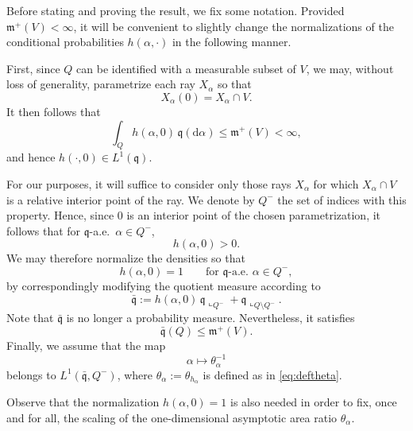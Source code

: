 \documentclass[a4paper,10pt]{article}
\newcommand{\mm}{\mathfrak m}
\newcommand{\qq}{\mathfrak q}
\theoremstyle{plain}
\theoremstyle{definition}
\numberwithin{equation}{section}
\begin{document}
Before stating and proving the result, we fix some notation.
Provided $\mm^+(V)<\infty$, it will be convenient to slightly change the normalizations of the conditional probabilities $h(\alpha,\cdot)$ in the following manner.  


First, since \( Q \) can be identified with a measurable subset of \( V \), we may, without loss of generality, parametrize each ray \( X_\alpha \) so that
\[
X_\alpha(0)=X_\alpha \cap V .
\]
It then follows that
\[
\int_Q h(\alpha,0)\,\qq(\mathrm d\alpha)
\le \mm^+(V)
< \infty,
\]
and hence \( h(\cdot,0) \in L^1(\qq) \).


For our purposes, it will suffice to consider only those rays \( X_\alpha \) for which \( X_\alpha \cap V \) is a relative interior point of the ray. We denote by \( Q^- \) the set of indices with this property. Hence, since \( 0 \) is an interior point of the chosen parametrization, it follows that for \( \qq \)-a.e.\ \( \alpha \in Q^- \),
\[
h(\alpha,0) > 0.
\]
%
We may therefore normalize the densities so that
\begin{equation}\label{eq:halpha0=1}
h(\alpha,0)=1
\qquad \text{for } \qq\text{-a.e. } \alpha \in Q^-,
\end{equation}
by correspondingly modifying the quotient measure according to
\begin{equation}\label{eq:halpha(0)=1}
\bar{\qq}
:=
h(\alpha,0)\,\qq\llcorner_{Q^-}
+
\qq\llcorner_{Q\setminus Q^-}.
\end{equation}
%
Note that \( \bar{\qq} \) is no longer a probability measure. Nevertheless, it satisfies
\begin{equation}\label{eq:barqq(Q)leqmV}
\bar{\qq}(Q) \le \mm^+(V).
\end{equation}
Finally, we assume that the map
\[
\alpha \mapsto \theta_\alpha^{-1}
\]
belongs to \( L^1(\bar{\qq},Q^-) \), where \( \theta_\alpha := \theta_{h_\alpha} \) is defined as in \eqref{eq:deftheta}. 

Observe that the normalization \( h(\alpha,0)=1 \) is also needed in order to fix, once and for all, the scaling of the one-dimensional asymptotic area ratio $\theta_\alpha$.


 
\end{document}
